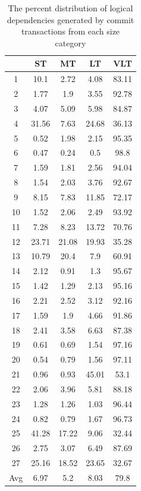 \documentclass[a4paper,twoside]{article}
\begin{document}
\begin{table}[!h]
\renewcommand{\arraystretch}{1.1}
\caption{The percent distribution of logical dependencies generated by commit transactions from each size category}
\label{table:6}
\centering
\begin{tabular}{|c|c|c|c|c|}
\hline
   &	ST	&	MT	&	LT	&	VLT	\\
\hline
1	&	10.1	&	2.72	&	4.08	&	83.11	\\
2	&	1.77	&	1.9	&	3.55	&	92.78	\\
3	&	4.07	&	5.09	&	5.98	&	84.87	\\
4	&	31.56	&	7.63	&	24.68	&	36.13	\\
5	&	0.52	&	1.98	&	2.15	&	95.35	\\
6	&	0.47	&	0.24	&	0.5	&	98.8	\\
7	&	1.59	&	1.81	&	2.56	&	94.04	\\
8	&	1.54	&	2.03	&	3.76	&	92.67	\\
9	&	8.15	&	7.83	&	11.85	&	72.17	\\
10	&	1.52	&	2.06	&	2.49	&	93.92	\\
11	&	7.28	&	8.23	&	13.72	&	70.76	\\
12	&	23.71	&	21.08	&	19.93	&	35.28	\\
13	&	10.79	&	20.4	&	7.9	&	60.91	\\
14	&	2.12	&	0.91	&	1.3	&	95.67	\\
15	&	1.42	&	1.29	&	2.13	&	95.16	\\
16	&	2.21	&	2.52	&	3.12	&	92.16	\\
17	&	1.59	&	1.9	&	4.66	&	91.86	\\
18	&	2.41	&	3.58	&	6.63	&	87.38	\\
19	&	0.61	&	0.69	&	1.54	&	97.16	\\
20	&	0.54	&	0.79	&	1.56	&	97.11	\\
21	&	0.96	&	0.93	&	45.01	&	53.1	\\
22	&	2.06	&	3.96	&	5.81	&	88.18	\\
23	&	1.28	&	1.26	&	1.03	&	96.44	\\
24	&	0.82	&	0.79	&	1.67	&	96.73	\\
25	&	41.28	&	17.22	&	9.06	&	32.44	\\
26	&	2.75	&	3.07	&	6.49	&	87.69	\\
27	&	25.16	&	18.52	&	23.65	&	32.67	\\

\hline
Avg	&	6.97	&	5.2	&	8.03	&	79.8	\\
\hline
\end{tabular}
\end{table}
\end{document}
